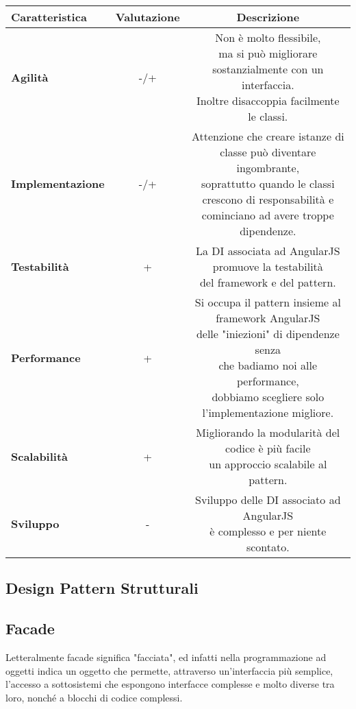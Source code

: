 {{{\begin{itemize}
				\small %
				{\renewcommand\arraystretch{1.2} %
					\begin{center} \begin{tabular}{|l|c|c|}
						\hline
						{\textbf{Caratteristica}}&{\textbf{Valutazione}}&{\textbf{Descrizione}}\\
						\hline
						\textbf{Agilità} & -/+ &  \minitab[c]{Non è molto flessibile,\\ ma si può migliorare sostanzialmente con un interfaccia.\\Inoltre disaccoppia facilmente le classi.} \\
						\hline
						\textbf{Implementazione} & -/+ &  \minitab[c]{Attenzione che creare istanze di classe può diventare ingombrante,\\ soprattutto quando le classi\\ crescono di responsabilità e cominciano ad avere troppe dipendenze.} \\
						\hline
						\textbf{Testabilità} & + &  \minitab[c]{La DI associata ad AngularJS promuove la testabilità\\del framework e del pattern.}\\
						\hline
						\textbf{Performance} & + &  \minitab[c]{Si occupa il pattern insieme al framework AngularJS\\delle "iniezioni" di dipendenze senza\\che badiamo noi alle performance,\\dobbiamo scegliere solo l'implementazione migliore.} \\
						\hline
						\textbf{Scalabilità} & + &  \minitab[c]{Migliorando la modularità del codice è più facile\\un approccio scalabile al pattern.}\\
						\hline
						\textbf{Sviluppo} & - &  \minitab[c]{Sviluppo delle DI associato ad AngularJS\\ è complesso e per niente scontato.}\\
						\hline
					\end{tabular} \end{center}
				}
			\end{itemize}
		}	
	}
	\subsection{Design Pattern Strutturali}{
		\subsection{Facade}{
			Letteralmente facade significa "facciata", ed infatti nella programmazione ad oggetti indica un oggetto che permette, attraverso un'interfaccia più semplice, l'accesso a sottosistemi che espongono interfacce complesse e molto diverse tra loro, nonché a blocchi di codice complessi.
			
}}}
